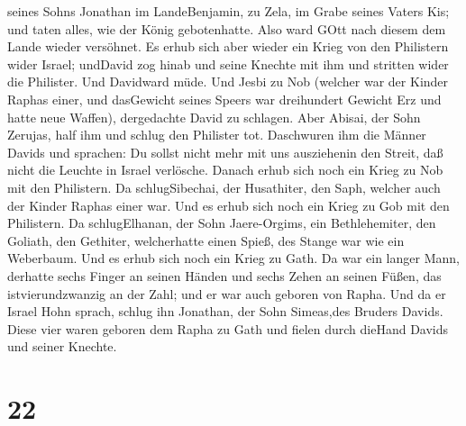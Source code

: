 seines Sohns Jonathan im LandeBenjamin, zu Zela, im Grabe seines Vaters
Kis; und taten alles, wie der König gebotenhatte. Also ward GOtt nach
diesem dem Lande wieder versöhnet.  Es erhub sich aber
wieder ein Krieg von den Philistern wider Israel; undDavid zog hinab und
seine Knechte mit ihm und stritten wider die Philister. Und Davidward
müde.  Und Jesbi zu Nob (welcher war der Kinder Raphas
einer, und dasGewicht seines Speers war dreihundert Gewicht Erz und
hatte neue Waffen), dergedachte David zu schlagen.  Aber
Abisai, der Sohn Zerujas, half ihm und schlug den Philister tot.
Daschwuren ihm die Männer Davids und sprachen: Du sollst nicht mehr mit
uns ausziehenin den Streit, daß nicht die Leuchte in Israel verlösche.
 Danach erhub sich noch ein Krieg zu Nob mit den
Philistern. Da schlugSibechai, der Husathiter, den Saph, welcher auch
der Kinder Raphas einer war.  Und es erhub sich noch ein
Krieg zu Gob mit den Philistern. Da schlugElhanan, der Sohn
Jaere-Orgims, ein Bethlehemiter, den Goliath, den Gethiter, welcherhatte
einen Spieß, des Stange war wie ein Weberbaum.  Und es
erhub sich noch ein Krieg zu Gath. Da war ein langer Mann, derhatte
sechs Finger an seinen Händen und sechs Zehen an seinen Füßen, das
istvierundzwanzig an der Zahl; und er war auch geboren von Rapha.
 Und da er Israel Hohn sprach, schlug ihn Jonathan, der
Sohn Simeas,des Bruders Davids.  Diese vier waren geboren
dem Rapha zu Gath und fielen durch dieHand Davids und seiner Knechte.

\hypertarget{section-21}{%
\section{22}\label{section-21}}


